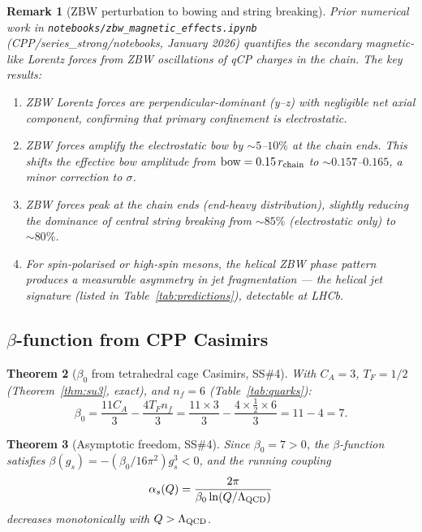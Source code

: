\documentclass[11pt,letterpaper]{article}
\newtheorem{theorem}{Theorem}[section]
\newtheorem{remark}[theorem]{Remark}
\newcommand{\as}{\alpha_s}
\begin{document}
\begin{remark}[ZBW perturbation to bowing and string breaking]
\label{rem:zbw_bow}
Prior numerical work in \texttt{notebooks/zbw\_magnetic\_effects.ipynb}
(CPP/series\_strong/notebooks, January 2026) quantifies the secondary
magnetic-like Lorentz forces from ZBW oscillations of qCP charges
in the chain.  The key results:
\begin{enumerate}
\item ZBW Lorentz forces are perpendicular-dominant (y--z) with
  negligible net axial component, confirming that primary
  confinement is electrostatic.
\item ZBW forces amplify the electrostatic bow by $\sim 5$--$10\%$
  at the chain ends.  This shifts the effective bow amplitude from
  $\text{bow} = 0.15\,r_{\rm chain}$ to $\sim 0.157$--$0.165$,
  a minor correction to $\sigma$.
\item ZBW forces peak at the chain ends (end-heavy distribution),
  slightly reducing the dominance of central string breaking from
  $\sim 85\%$ (electrostatic only) to $\sim 80\%$.
\item For spin-polarised or high-spin mesons, the helical ZBW phase
  pattern produces a measurable asymmetry in jet fragmentation ---
  the \emph{helical jet signature} (listed in
  Table~\ref{tab:predictions}), detectable at LHCb.
\end{enumerate}
\end{remark}

\subsection{$\beta$-function from CPP Casimirs}

\begin{theorem}[$\beta_0$ from tetrahedral cage Casimirs, SS\#4]
\label{thm:beta0}
With $C_A = 3$, $T_F = 1/2$ (Theorem~\ref{thm:su3}, exact), and
$n_f = 6$ (Table~\ref{tab:quarks}):
\begin{equation}
\beta_0 = \frac{11C_A}{3} - \frac{4T_F n_f}{3}
= \frac{11\times3}{3} - \frac{4\times\tfrac{1}{2}\times6}{3}
= 11 - 4 = 7.
\label{eq:beta0}
\end{equation}
\end{theorem}

\begin{theorem}[Asymptotic freedom, SS\#4]
\label{thm:af}
Since $\beta_0 = 7 > 0$, the $\beta$-function satisfies
$\beta(g_s) = -(\beta_0/16\pi^2)g_s^3 < 0$, and the running
coupling
\begin{equation}
\as(Q) = \frac{2\pi}{\beta_0\ln(Q/\Lambda_{\rm QCD})}
\label{eq:running}
\end{equation}
decreases monotonically with $Q > \Lambda_{\rm QCD}$.
\end{theorem}
\end{document}
